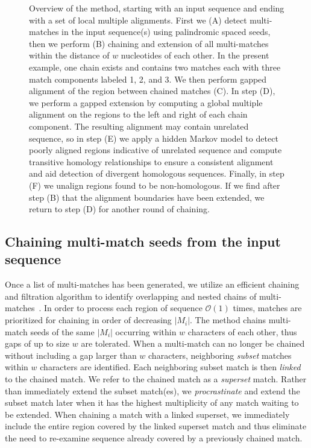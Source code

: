 \documentclass[12pt,journal,draftcls,letterpaper,onecolumn]{IEEEtran}
\begin{document}
\begin{figure}[t!]
\begin{center}
\end{center}
\caption
{Overview of the method, starting with an input sequence and ending
with a set of local multiple alignments. First we (A) detect
multi-matches in the input sequence(s) using palindromic spaced seeds,
then we perform (B) chaining and extension of all multi-matches within
the distance of $w$ nucleotides of each other.  In the present example, one chain exists and
contains two matches each with three match components labeled 1, 2,
and 3.  We then perform gapped alignment of the region between chained
matches (C).  In step (D), we perform a gapped extension by computing
a global multiple alignment on the regions to the left and right of
each chain component.  The resulting alignment may contain unrelated
sequence, so in step (E) we apply a hidden Markov model to detect
poorly aligned regions indicative of unrelated sequence and
compute transitive homology relationships to ensure a consistent
alignment and aid detection of divergent homologous sequences.
Finally, in step (F) we unalign regions found to be non-homologous.
If we find after step (B) that the alignment boundaries have been
extended, we return to step (D) for another round of chaining.}
\label{fig-main}
\end{figure}

\subsection{Chaining multi-match seeds from the input sequence}
Once a list of multi-matches has been generated, we utilize an
efficient chaining and filtration algorithm to identify overlapping
and nested chains of multi-matches~\cite{ref-procrast}. In order to
process each region of sequence $\mathcal{O}(1)$ times, matches
are prioritized for chaining in order of decreasing $|M_i|$.  The
method chains multi-match seeds of the same $|M_i|$
occurring within $w$ characters of each other, thus gaps of up to size
$w$ are tolerated.  When a multi-match can
no longer be chained without including a gap larger than $w$
characters, neighboring \textit{subset} matches within $w$ characters
are identified. Each neighboring subset match is then \textit{linked}
to the chained match. We refer to the chained match as a
\textit{superset} match. Rather than immediately extend the subset
match(es), we \textit{procrastinate} and extend the subset match later
when it has the highest multiplicity of any match waiting to be
extended. When chaining a match with a linked superset, we immediately
include the entire region covered by the linked superset match and
thus eliminate the need to re-examine sequence already covered by a
previously chained match.
\end{document}
